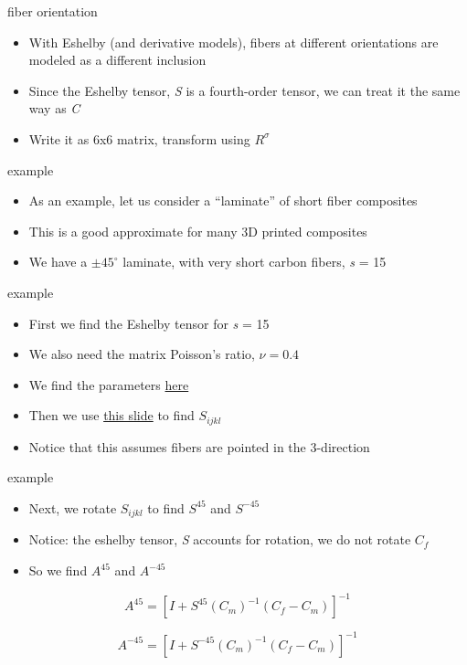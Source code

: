 \documentclass[
  letterpaper,
  ignorenonframetext,
  aspectratio=43,
  handout,
  12pt]{beamer}
\providecommand{\tightlist}{%
  \setlength{\itemsep}{0pt}\setlength{\parskip}{0pt}}
\providecommand{\tightlist}{%
\setlength{\itemsep}{0pt}\setlength{\parskip}{0pt}}
\begin{document}
\begin{frame}{fiber orientation}
\protect\hypertarget{fiber-orientation}{}
\begin{itemize}
\tightlist
\item
  With Eshelby (and derivative models), fibers at different orientations
  are modeled as a different inclusion
\item
  Since the Eshelby tensor, \emph{S} is a fourth-order tensor, we can
  treat it the same way as \emph{C}
\item
  Write it as 6x6 matrix, transform using \(R^\sigma\)
\end{itemize}
\end{frame}

\begin{frame}{example}
\protect\hypertarget{example}{}
\begin{itemize}
\tightlist
\item
  As an example, let us consider a ``laminate'' of short fiber
  composites
\item
  This is a good approximate for many 3D printed composites
\item
  We have a \(\pm 45^\circ\) laminate, with very short carbon fibers,
  \emph{s} = 15
\end{itemize}
\end{frame}

\begin{frame}{example}
\protect\hypertarget{example-1}{}
\begin{itemize}
\tightlist
\item
  First we find the Eshelby tensor for \emph{s} = 15
\item
  We also need the matrix Poisson's ratio, \(\nu = 0.4\)
\item
  We find the parameters \protect\hyperlink{ux2feshelby-params}{here}
\item
  Then we use \protect\hyperlink{ux2feshelby-table}{this slide} to find
  \(S_{ijkl}\)
\item
  Notice that this assumes fibers are pointed in the 3-direction
\end{itemize}
\end{frame}

\begin{frame}{example}
\protect\hypertarget{example-2}{}
\begin{itemize}
\tightlist
\item
  Next, we rotate \(S_{ijkl}\) to find \(S^{45}\) and \(S^{-45}\)
\item
  Notice: the eshelby tensor, \emph{S} accounts for rotation, we do not
  rotate \(C_f\)
\item
  So we find \(A^{45}\) and \(A^{-45}\)
\end{itemize}

\[A^{45} = \left[I + S^{45} (C_m)^{-1}(C_f-C_m) \right]^{-1}\]

\[A^{-45} = \left[I + S^{-45} (C_m)^{-1}(C_f-C_m) \right]^{-1}\]
\end{frame}
\end{document}
